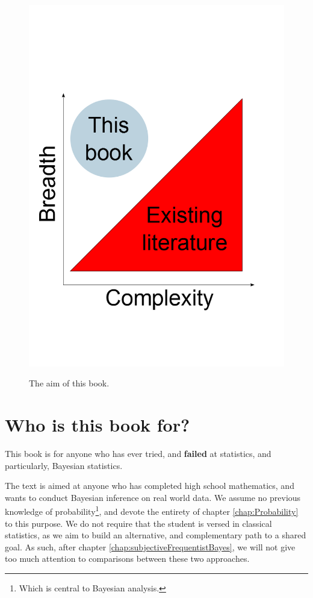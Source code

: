 \documentclass[11pt,fullpage]{book}
\begin{document}
\begin{figure}
\centering
\scalebox{0.3} 
{\includegraphics{HowToUse_existingLiterature.png}}
\caption{The aim of this book.}\label{fig:HowToUse_existingLiterature}
\end{figure}


\section{Who is this book for?}
This book is for anyone who has ever tried, and \textbf{failed} at statistics, and particularly, Bayesian statistics.

The text is aimed at anyone who has completed high school mathematics, and wants to conduct Bayesian inference on real world data. We assume no previous knowledge of probability\footnote{Which is central to Bayesian analysis.}, and devote the entirety of chapter \ref{chap:Probability} to this purpose. We do not require that the student is versed in classical statistics, as we aim to build an alternative, and complementary path to a shared goal. As such, after chapter \ref{chap:subjectiveFrequentistBayes}, we will not give too much attention to comparisons between these two approaches.
\end{document}
